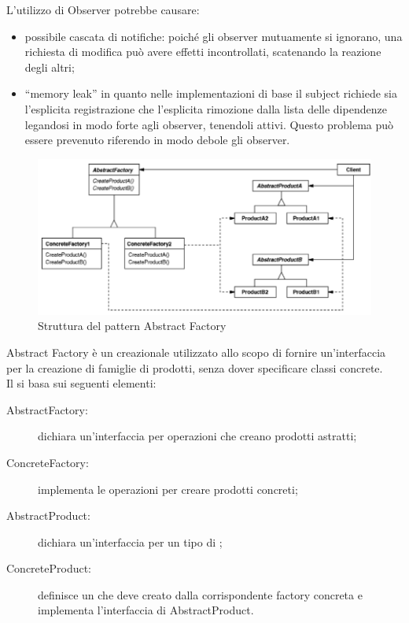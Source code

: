 		L’utilizzo di Observer potrebbe causare:
		\begin{itemize}
			\item possibile cascata di notifiche: poiché gli observer mutuamente si ignorano, una richiesta di modifica può avere effetti incontrollati, scatenando la reazione degli altri;
			\item “memory leak” in quanto nelle implementazioni di base il subject richiede sia l’esplicita registrazione che l’esplicita rimozione dalla lista delle dipendenze legandosi in modo forte agli observer, tenendoli attivi. Questo problema può essere prevenuto riferendo in modo debole gli observer.
		\end{itemize}

	 \label{app:abstractfactory}
	\begin{figure}[H]\centering
    \includegraphics[scale=0.7]{SpecificaTecnica/Pics/AbstractFactory}
    \caption{Struttura del pattern Abstract Factory}
	\end{figure}
	Abstract Factory è un  creazionale utilizzato allo scopo di fornire un'interfaccia per la creazione di famiglie di prodotti, senza dover specificare classi concrete.\\
	Il  si basa sui seguenti elementi:
	\begin{description}
		\item[AbstractFactory:] dichiara un'interfaccia per operazioni che creano prodotti astratti;
		\item[ConcreteFactory:] implementa le operazioni per creare prodotti concreti;
		\item[AbstractProduct:] dichiara un'interfaccia per un tipo di ;
		\item[ConcreteProduct:] definisce un  che deve creato dalla corrispondente factory concreta e implementa l'interfaccia di AbstractProduct.
	\end{description}

